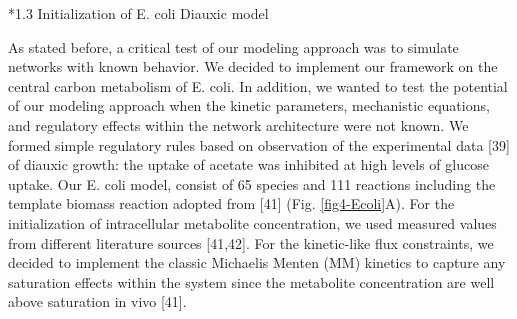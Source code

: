 \documentclass[12pt]{article}
\makeatletter
\renewcommand\subsection{\@startsection
	{subsection}{2}{0mm}
	{-0.05in}
	{-0.5\baselineskip}
	{\normalfont\normalsize\bfseries}}
\makeatother
\begin{document}
\subsection*{1.3 Initialization of E. coli Diauxic model}

As stated before, a critical test of our modeling approach was to simulate networks with known behavior. We decided to implement our framework on the central carbon metabolism of E. coli. In addition, we wanted to test the potential of our modeling approach when the kinetic parameters, mechanistic equations, and regulatory effects within the network architecture were not known. We formed simple regulatory rules based on observation of the experimental data [39] of diauxic growth: the uptake of acetate was inhibited at high levels of glucose uptake. Our E. coli model, consist of 65 species and 111 reactions including the template biomass reaction adopted from [41] (Fig. \ref{fig4-Ecoli}A). For the initialization of intracellular metabolite concentration, we used measured values from different literature sources [41,42]. For the kinetic-like flux constraints, we decided to implement the classic Michaelis Menten (MM) kinetics to capture any saturation effects within the system since the metabolite concentration are well above saturation in vivo [41].
\end{document}
